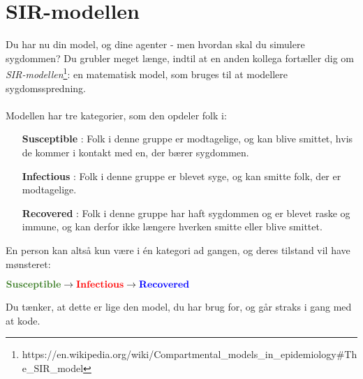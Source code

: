 \documentclass{article}
\begin{document}
\section{SIR-modellen}
Du har nu din model, og dine agenter - men hvordan skal du simulere sygdommen? Du grubler meget længe, indtil at en anden kollega fortæller dig om \textit{SIR-modellen}\footnote{https://en.wikipedia.org/wiki/Compartmental\_models\_in\_epidemiology\#The\_SIR\_model}: en matematisk model, som bruges til at modellere sygdomsspredning.\\\\
Modellen har tre kategorier, som den opdeler folk i:
\begin{itemize}
\item[{\color{OliveGreen}\textbf{Susceptible}}]: Folk i denne gruppe er modtagelige, og kan blive smittet, hvis de kommer i kontakt med en, der bærer sygdommen.
\item[{\color{red}\textbf{Infectious}}]: Folk i denne gruppe er blevet syge, og kan smitte folk, der er modtagelige.
\item[{\color{blue}\textbf{Recovered}}]: Folk i denne gruppe har haft sygdommen og er blevet raske og immune, og kan derfor ikke længere hverken smitte eller blive smittet.
\end{itemize}
En person kan altså kun være i én kategori ad gangen, og deres tilstand vil have mønsteret:
\begin{center}
  $\textbf{\color{OliveGreen}Susceptible} \to \textbf{\color{red}Infectious} \to \textbf{\color{blue}Recovered}$
\end{center}
Du tænker, at dette er lige den model, du har brug for, og går straks i gang med at kode.
\end{document}
